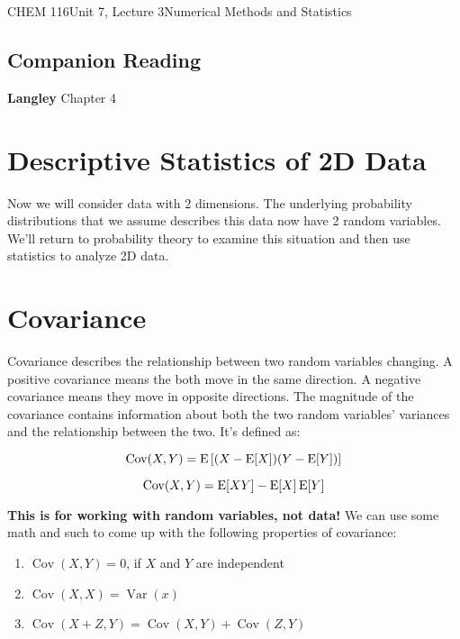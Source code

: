 \documentclass{article}
\DeclareMathOperator{\Var}{Var}
\DeclareMathOperator{\Cov}{Cov}
\begin{document}
\begin{tdoc}{CHEM 116}{Unit 7, Lecture 3}{Numerical Methods and Statistics}

  \subsection*{Companion Reading}
  \textbf{Langley} Chapter 4


\section{Descriptive Statistics of 2D Data}

Now we will consider data with 2 dimensions. The underlying probability distributions that we assume describes this data now have 2 random variables. We'll return to probability theory to examine this situation and then use statistics to analyze 2D data.

\section{Covariance}
Covariance describes the relationship between two random variables
changing. A positive covariance means the both move in the same
direction. A negative covariance means they move in opposite
directions. The magnitude of the covariance contains information about
both the two random variables' variances and the relationship between
the two. It's defined as:

\begin{equation}
  \Cov(X,Y) = \E\left[(X - \E[X])(Y - \E[Y])\right]
\end{equation}

\begin{equation}
  \Cov(X,Y) = \E[XY] - \E[X]\E[Y]
\end{equation}

{\bf This is for working with random variables, not data!} We can use
some math and such to come up with the following properties of covariance:

\begin{enumerate}

\item $\Cov(X,Y) = 0$, if $X$ and $Y$ are independent\\

\item $\Cov(X,X) = \Var(x)$\\

\item $\Cov(X + Z, Y) = \Cov(X,Y) + \Cov(Z, Y)$\\


\end{enumerate}
\end{tdoc}
\end{document}
